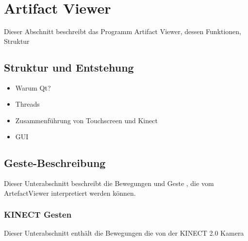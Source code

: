 \documentclass[12pt]{extarticle}
\begin{document}
\section{Artifact Viewer}
Dieser Abschnitt beschreibt das Programm Artifact Viewer, dessen Funktionen, Struktur

\subsection{Struktur und Entstehung}
	\begin{itemize}
	\item Warum Qt?
	\item Threads
	\item Zusammenführung von Touchscreen und Kinect
	\item GUI
	\end{itemize}
	
\subsection{Geste-Beschreibung}
Dieser Unterabschnitt beschreibt die Bewegungen und Geste , die vom ArtefactViewer interpretiert werden können.
\subsubsection{KINECT Gesten}
Dieser Unterabschnitt enthält die Bewegungen die von der KINECT 2.0 Kamera
\end{document}
